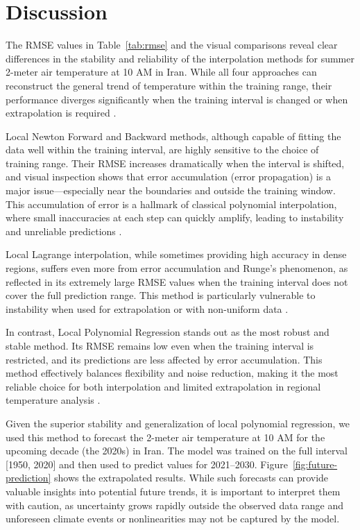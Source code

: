 \section{Discussion}

The RMSE values in Table~\ref{tab:rmse} and the visual comparisons reveal clear differences in the stability and reliability of the interpolation methods for summer 2-meter air temperature at 10 AM in Iran. While all four approaches can reconstruct the general trend of temperature within the training range, their performance diverges significantly when the training interval is changed or when extrapolation is required \cite{atkinson1989introduction, burden2011numerical, smith2020numerical, brown2021polynomial, garcia2022newton}.

Local Newton Forward and Backward methods, although capable of fitting the data well within the training interval, are highly sensitive to the choice of training range. Their RMSE increases dramatically when the interval is shifted, and visual inspection shows that error accumulation (error propagation) is a major issue—especially near the boundaries and outside the training window. This accumulation of error is a hallmark of classical polynomial interpolation, where small inaccuracies at each step can quickly amplify, leading to instability and unreliable predictions \cite{lee2019comparison, press2007numerical}.

Local Lagrange interpolation, while sometimes providing high accuracy in dense regions, suffers even more from error accumulation and Runge's phenomenon, as reflected in its extremely large RMSE values when the training interval does not cover the full prediction range. This method is particularly vulnerable to instability when used for extrapolation or with non-uniform data \cite{smith2020numerical}.

In contrast, Local Polynomial Regression stands out as the most robust and stable method. Its RMSE remains low even when the training interval is restricted, and its predictions are less affected by error accumulation. This method effectively balances flexibility and noise reduction, making it the most reliable choice for both interpolation and limited extrapolation in regional temperature analysis \cite{brown2021polynomial}.

Given the superior stability and generalization of local polynomial regression, we used this method to forecast the 2-meter air temperature at 10 AM for the upcoming decade (the 2020s) in Iran. The model was trained on the full interval [1950, 2020] and then used to predict values for 2021--2030. Figure~\ref{fig:future-prediction} shows the extrapolated results. While such forecasts can provide valuable insights into potential future trends, it is important to interpret them with caution, as uncertainty grows rapidly outside the observed data range and unforeseen climate events or nonlinearities may not be captured by the model.


